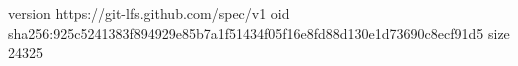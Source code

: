 version https://git-lfs.github.com/spec/v1
oid sha256:925c5241383f894929e85b7a1f51434f05f16e8fd88d130e1d73690c8ecf91d5
size 24325
